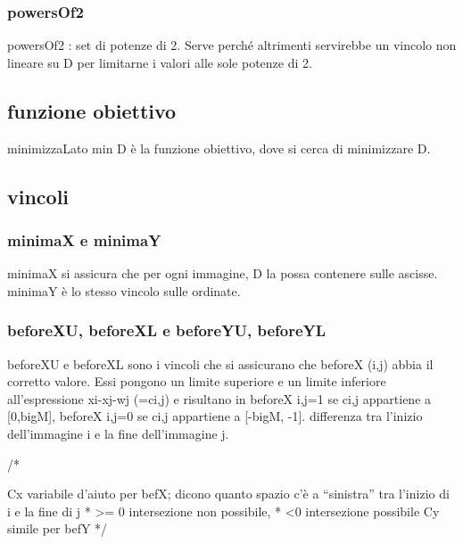 \subsubsection{powersOf2}
powersOf2 : set di potenze di 2. Serve perché altrimenti servirebbe un vincolo non lineare su D per limitarne i valori alle sole potenze di 2. \\














\subsection{funzione obiettivo}
minimizzaLato min D è la funzione obiettivo, dove si cerca di minimizzare D.




\subsection{vincoli}

\subsubsection{minimaX e minimaY}
minimaX si assicura che per ogni immagine, D la possa contenere sulle ascisse. \\
minimaY è lo stesso vincolo sulle ordinate.

\subsubsection{beforeXU, beforeXL e beforeYU, beforeYL}
beforeXU e beforeXL sono i vincoli che si assicurano che beforeX (i,j) abbia il corretto valore. Essi pongono un limite superiore e un limite inferiore all'espressione xi-xj-wj (=ci,j) e risultano in beforeX i,j=1 se ci,j appartiene a [0,bigM], beforeX i,j=0 se ci,j appartiene a [-bigM, -1].
differenza tra l'inizio dell'immagine i e  la fine dell'immagine j.






/*


Cx variabile d'aiuto per befX; dicono quanto spazio c'è a “sinistra” tra l'inizio di i e la fine di j
* >= 0 intersezione non possibile, 
* <0 intersezione possibile
Cy simile per befY
*/




